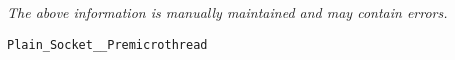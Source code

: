 \label{pkg:plain\_socket\_\_premicrothread}

{\tiny \it The above information is manually maintained and may contain errors.}
\begin{verbatim}
Plain_Socket__Premicrothread
\end{verbatim}
